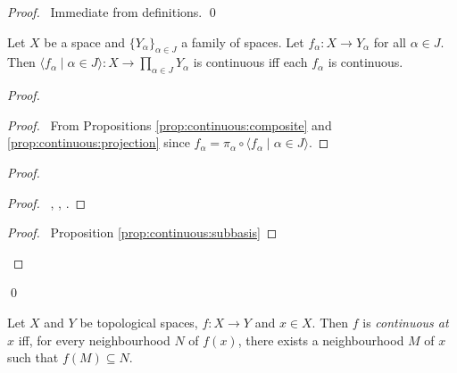 \begin{proof}
  \pf\ Immediate from definitions. \qed
\end{proof}

\begin{prop}
  \label{prop:continuous:coordinate}
  Let $X$ be a space and $\{ Y_\alpha \}_{\alpha \in J}$ a family of spaces. Let $f_\alpha : X \rightarrow Y_\alpha$ for all $\alpha \in J$.
  Then $\langle f_\alpha \mid \alpha \in J \rangle : X \rightarrow \prod_{\alpha \in J} Y_\alpha$ is continuous iff each $f_\alpha$ is continuous.
\end{prop}

\begin{proof}
  \pf
  \begin{proof}
    \pf\ From Propositions \ref{prop:continuous:composite} and \ref{prop:continuous:projection} since $f_\alpha = \pi_\alpha \circ \langle f_\alpha \mid \alpha \in J \rangle$.
  \end{proof}
  \begin{proof}
    \begin{proof}
      \pf\ , , .
    \end{proof}
    \qedstep
    \begin{proof}
      \pf\ Proposition \ref{prop:continuous:subbasis}
    \end{proof}
  \end{proof}
  \qed
\end{proof}

\begin{df}
  Let $X$ and $Y$ be topological spaces, $f : X \rightarrow Y$ and $x \in X$. Then $f$ is \emph{continuous at $x$} iff, for every neighbourhood $N$ of $f(x)$,
  there exists a neighbourhood $M$ of $x$ such that $f(M) \subseteq N$.
\end{df}

